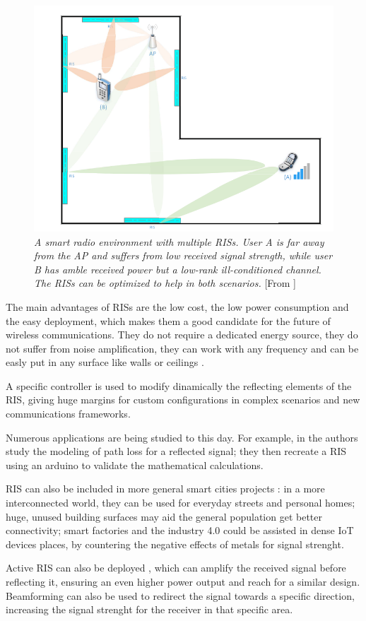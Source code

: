 \begin{figure}[H]
  \centering
  \includegraphics[width=0.5\linewidth]{imgs/RIS enviroment.png}
  \caption{\textit{A smart radio environment with multiple RISs. User A is far away
      from the AP and suffers from low received signal strength, while user B has
      amble received power but a low-rank ill-conditioned channel. The RISs can
      be optimized to help in both scenarios.} [From \cite{9086766}]}
\end{figure}

The main advantages of RISs are the low cost, the low power consumption and the easy deployment, which makes them a good candidate for the future of wireless communications. They do not require a dedicated energy source, they do not suffer from noise amplification, they can work with any frequency and can be easly put in any surface like walls or ceilings \cite{8796365}.

A specific controller is used to modify dinamically the reflecting elements of the RIS, giving huge margins for custom configurations in complex scenarios and new communications frameworks.

Numerous applications are being studied to this day. For example, in \cite{9881509} the authors study the modeling of path loss for a reflected signal; they then recreate a RIS using an arduino to validate the mathematical calculations.

RIS can also be included in more general smart cities projects \cite{9253607}: in a more interconnected world, they can be used for everyday streets and personal homes; huge, unused building surfaces may aid the general population get better connectivity; smart factories and the industry 4.0 could be assisted in dense IoT devices places, by countering the negative effects of metals for signal strenght.

Active RIS can also be deployed \cite{9377648}, which can amplify the received signal before reflecting it, ensuring an even higher power output and reach for a similar design. Beamforming can also be used to redirect the signal towards a specific direction, increasing the signal strenght for the receiver in that specific area.

